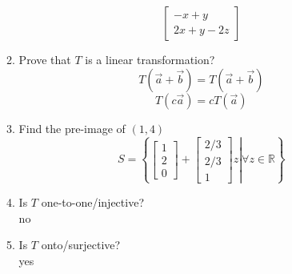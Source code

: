 \documentclass[11pt]{article}
\begin{document}
\begin{enumerate}
\begin{enumerate}
                \[\begin{bmatrix} -x+y \\ 2x+y-2z \end{bmatrix}\]
          \item Prove that $T$ is a linear transformation?\\
                \[T(\vec{a} + \vec{b}) = T(\vec{a} + \vec{b})\]
                \[T(c\vec{a}) = cT(\vec{a})\]
          \item Find the pre-image of $(1, 4)$ \\
                \[S = \left\{\left. \begin{bmatrix} 1 \\ 2 \\ 0 \end{bmatrix}  + \begin{bmatrix} 2/3 \\ 2/3 \\ 1 \end{bmatrix} z \right | \forall z \in \mathbb{R}\right\}\]
          \item Is $T$ one-to-one/injective?\\
                no\\
          \item Is $T$ onto/surjective? \\
          yes
        \end{enumerate}

\end{enumerate}
\end{document}
